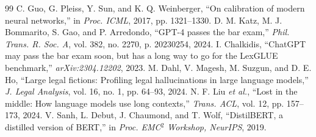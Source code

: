 \documentclass[journal]{IEEEtran}
\begin{document}
\begin{thebibliography}{99}
 C. Guo, G. Pleiss, Y. Sun, and K. Q. Weinberger, ``On calibration of modern neural networks,'' in \emph{Proc. ICML}, 2017, pp. 1321--1330.
 D. M. Katz, M. J. Bommarito, S. Gao, and P. Arredondo, ``GPT-4 passes the bar exam,'' \emph{Phil. Trans. R. Soc. A}, vol. 382, no. 2270, p. 20230254, 2024.
 I. Chalkidis, ``ChatGPT may pass the bar exam soon, but has a long way to go for the LexGLUE benchmark,'' \emph{arXiv:2304.12202}, 2023.
 M. Dahl, V. Magesh, M. Suzgun, and D. E. Ho, ``Large legal fictions: Profiling legal hallucinations in large language models,'' \emph{J. Legal Analysis}, vol. 16, no. 1, pp. 64--93, 2024.
 N. F. Liu \emph{et al.}, ``Lost in the middle: How language models use long contexts,'' \emph{Trans. ACL}, vol. 12, pp. 157--173, 2024.
 V. Sanh, L. Debut, J. Chaumond, and T. Wolf, ``DistilBERT, a distilled version of BERT,'' in \emph{Proc. EMC$^2$ Workshop, NeurIPS}, 2019.
\end{thebibliography}
\end{document}
